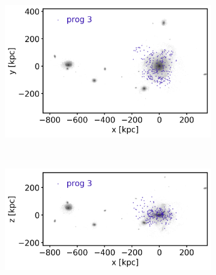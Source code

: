 \begin{figure}[htbp]
    \begin{subfigure}[c]{0.45\textwidth}
    \centering
    	\includegraphics[width=\textwidth]{plots/Dynamics/dist/xy_dist_selected_GCs_prog_3_snap_127.png}
    	\label{fig:prog3_xy}
    \end{subfigure}
    ~ %
    \begin{subfigure}[c]{0.45\textwidth}
        \centering
    	\includegraphics[width=\textwidth]{plots/Dynamics/dist/xz_dist_selected_GCs_prog_3_snap_127.png}
	    \label{fig:prog3_xz}
    \end{subfigure}
    

\end{figure}
